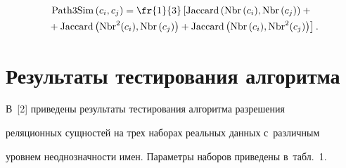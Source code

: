 \begin{enumerate}[1.]
 \begin{multline*}


  \mathrm{Path3Sim}\left(c_i, c_j\right) =\fr{1}{3}\left[ \mathrm{Jaccard}\left( \mathrm{Nbr}\,(c_i), 


\mathrm{Nbr}\,(c_j)\right)+ {}\right.\\


\left.{}+\mathrm{Jaccard}\left( \mathrm{Nbr}^2(c_i), \mathrm{Nbr}\,(c_j)\right)+ 


\mathrm{Jaccard}\left( \mathrm{Nbr}\,(c_i), \mathrm{Nbr}^2(c_j)\right)\right].


  \end{multline*}


\end{enumerate}





\section{Результаты тестирования алгоритма}


  


  В~[2] приведены результаты тестирования алгоритма разрешения 


реляционных сущностей на трех наборах реальных данных с~различным 


уровнем неоднозначности имен. Па\-ра\-мет\-ры наборов приведены в~табл.~1.


  


